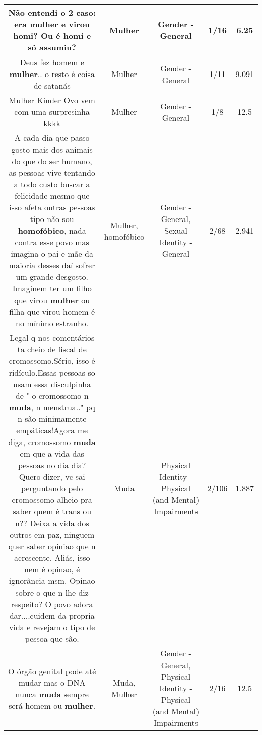 \documentclass[11pt]{article}
\newlength\mylength
\begin{document}
\begin{center}
\begin{longtable}{|C{.65\mylength}|C{.30\mylength}|C{.12\mylength}|C{.12\mylength}|C{.12\mylength}|}
  \small Não entendi o 2 caso: era \textbf{mulher} e virou homi? Ou é homi e só assumiu?\normalsize   & Mulher & Gender - General & 1/16 & 6.25 \\  \hline
  \small Deus fez homem e \textbf{mulher}.. o resto é coisa de satanás\normalsize   & Mulher & Gender - General & 1/11 & 9.091 \\  \hline
  \small Mulher Kinder Ovo vem com uma surpresinha kkkk\normalsize   & Mulher & Gender - General & 1/8 & 12.5 \\  \hline
  \small A cada dia que passo gosto mais dos animais do que do ser humano, as pessoas vive tentando a todo custo buscar a felicidade mesmo que isso afeta outras pessoas tipo não sou \textbf{homofóbico}, nada contra esse povo mas imagina o pai e mãe da maioria desses daí sofrer um grande desgosto. Imaginem ter um filho que virou \textbf{mulher} ou filha que virou homem é no mínimo estranho.\normalsize   & Mulher, homofóbico & Gender - General, Sexual Identity - General & 2/68 & 2.941 \\  \hline
  \small Legal q nos comentários ta cheio de fiscal de cromossomo.Sério, isso é ridículo.Essas pessoas so usam essa disculpinha de " o cromossomo n \textbf{muda}, n menstrua.." pq n são minimamente empáticas!Agora me diga, cromossomo \textbf{muda} em que a vida das pessoas no dia dia? Quero dizer, vc sai perguntando pelo cromossomo alheio pra saber quem é trans ou n?? Deixa a vida dos outros em paz, ninguem quer saber opiniao que n acrescente. Aliás, isso nem é opinao, é ignorância msm. Opinao sobre o que n lhe diz respeito? O povo adora dar....cuidem da propria vida e revejam o tipo de pessoa que são.\normalsize   & Muda & Physical Identity - Physical (and Mental) Impairments & 2/106 & 1.887 \\  \hline
  \small O órgão genital pode até mudar mas o DNA nunca \textbf{muda} sempre será homem ou \textbf{mulher}.\normalsize   & Muda, Mulher & Gender - General, Physical Identity - Physical (and Mental) Impairments & 2/16 & 12.5 \\  \hline

\end{longtable}
\end{center}
\end{document}
